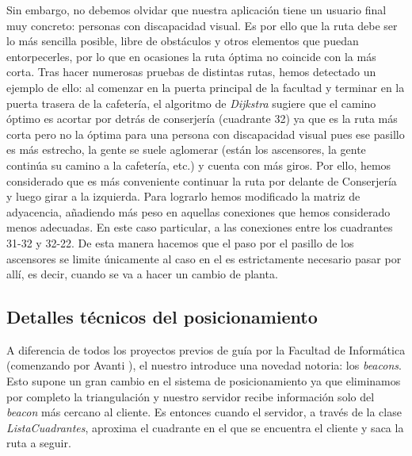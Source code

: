 Sin embargo, no debemos olvidar que nuestra aplicación tiene un usuario final muy concreto: personas con discapacidad visual. Es por ello que la ruta debe ser lo más sencilla posible, libre de obstáculos y otros elementos que puedan entorpecerles, por lo que en ocasiones la ruta óptima no coincide con la más corta. Tras hacer numerosas pruebas de distintas rutas, hemos detectado un ejemplo de ello: al comenzar en la puerta principal de la facultad y terminar en la puerta trasera de la cafetería, el algoritmo de \textit{Dijkstra} sugiere que el camino óptimo es acortar por detrás de conserjería (cuadrante 32) ya que es la ruta más corta pero no la óptima para una persona con discapacidad visual pues ese pasillo es más estrecho, la gente se suele aglomerar (están los ascensores, la gente continúa su camino a la cafetería, etc.) y cuenta con más giros. Por ello, hemos considerado que es más conveniente continuar la ruta por delante de Conserjería y luego girar a la izquierda. Para lograrlo hemos modificado la matriz de adyacencia, añadiendo más peso en aquellas conexiones que hemos considerado menos adecuadas. En este caso particular, a las conexiones entre los cuadrantes 31-32 y 32-22. De esta manera hacemos que el paso por el pasillo de los ascensores se limite únicamente al caso en el es estrictamente necesario pasar por allí, es decir, cuando se va a hacer un cambio de planta.


\subsection{Detalles técnicos del posicionamiento}


A diferencia de todos los proyectos previos de guía por la Facultad de Informática (comenzando por Avanti \citep{avanti}), el nuestro introduce una novedad notoria: los \textit{beacons}. Esto supone un gran cambio en el sistema de posicionamiento ya que eliminamos por completo la triangulación y nuestro servidor recibe información solo del \textit{beacon} más cercano al cliente. Es entonces cuando el servidor, a través de la clase \textit{ListaCuadrantes}, aproxima el cuadrante en el que se encuentra el cliente y saca la ruta a seguir.  %


